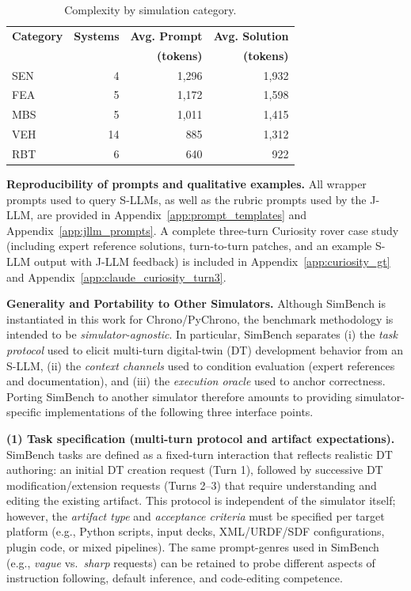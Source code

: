 \documentclass{ieeeaccess}
\begin{document}
\begin{table}[h!]
    \centering
    \caption{Complexity by simulation category.}
    \label{tab:category_complexity}
    \begin{tabular}{l r r r}
        \toprule
        \textbf{Category} & \textbf{Systems} & \textbf{Avg. Prompt} & \textbf{Avg. Solution} \\
        & & \textbf{(tokens)} & \textbf{(tokens)} \\
        \midrule
        SEN & 4 & 1,296 & 1,932 \\
        FEA & 5 & 1,172 & 1,598 \\
        MBS & 5 & 1,011 & 1,415 \\
        VEH & 14 & 885 & 1,312 \\
        RBT & 6 & 640 & 922 \\
        \bottomrule
    \end{tabular}
\end{table}

\noindent\textbf{Reproducibility of prompts and qualitative examples.}
All wrapper prompts used to query S-LLMs, as well as the rubric prompts used by the J-LLM, are provided in Appendix~\ref{app:prompt_templates} and Appendix~\ref{app:jllm_prompts}.
A complete three-turn Curiosity rover case study (including expert reference solutions, turn-to-turn patches, and an example S-LLM output with J-LLM feedback) is included in Appendix~\ref{app:curiosity_gt} and Appendix~\ref{app:claude_curiosity_turn3}.

\bigskip

\noindent\textbf{Generality and Portability to Other Simulators.}
Although SimBench is instantiated in this work for Chrono/PyChrono, the benchmark methodology is intended to be \emph{simulator-agnostic}. In particular, SimBench separates (i) the \emph{task protocol} used to elicit multi-turn digital-twin (DT) development behavior from an S-LLM, (ii) the \emph{context channels} used to condition evaluation (expert references and documentation), and (iii) the \emph{execution oracle} used to anchor correctness. Porting SimBench to another simulator therefore amounts to providing simulator-specific implementations of the following three interface points.

\textbf{(1) Task specification (multi-turn protocol and artifact expectations).}
SimBench tasks are defined as a fixed-turn interaction that reflects realistic DT authoring: an initial DT creation request (Turn 1), followed by successive DT modification/extension requests (Turns 2--3) that require understanding and editing the existing artifact. This protocol is independent of the simulator itself; however, the \emph{artifact type} and \emph{acceptance criteria} must be specified per target platform (e.g., Python scripts, input decks, XML/URDF/SDF configurations, plugin code, or mixed pipelines). The same prompt-genres used in SimBench (e.g., \emph{vague} vs.\ \emph{sharp} requests) can be retained to probe different aspects of instruction following, default inference, and code-editing competence.
\end{document}
